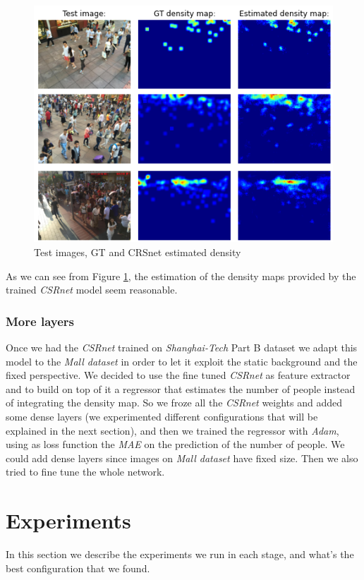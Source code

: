 \documentclass[10pt,twocolumn,letterpaper]{article}
\begin{document}
\begin{figure}[h!]
	\includegraphics[width=\linewidth]{pics/DMpred.png}
	\caption{Test images, GT and CRSnet estimated density}
	\label{fig:DMpred}
\end{figure}

As we can see from Figure \ref{fig:DMpred}, the estimation of the density maps provided by the trained \textit{CSRnet} model seem reasonable.
\subsubsection{More layers}
Once we had the \textit{CSRnet} trained on \textit{Shanghai-Tech} Part B dataset we adapt this model to the \textit{Mall dataset} in order to let it exploit the static background and the fixed perspective. We decided to use the fine tuned \textit{CSRnet} as feature extractor and to build on top of it a regressor that estimates the number of people instead of integrating the density map. So we froze all the \textit{CSRnet} weights and added some dense layers (we experimented different configurations that will be explained in the next section), and then we trained the regressor with \textit{Adam}, using as loss function the \textit{MAE} on the prediction of the number of people. We could add dense layers since images on \textit{Mall dataset} have fixed size. Then we also tried to fine tune the whole network.
\section{Experiments}
In this section we describe the experiments we run in each stage, and what's the best configuration that we found.
\end{document}
